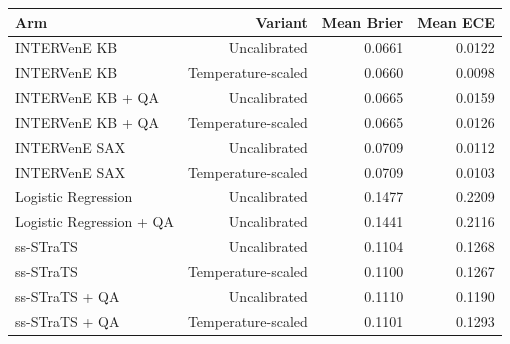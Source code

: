 \begin{tabular}{lrrr}
\toprule
Arm & Variant & Mean Brier & Mean ECE \\
\midrule
INTERVenE KB & Uncalibrated & 0.0661 & 0.0122 \\
INTERVenE KB & Temperature-scaled & 0.0660 & 0.0098 \\
INTERVenE KB + QA & Uncalibrated & 0.0665 & 0.0159 \\
INTERVenE KB + QA & Temperature-scaled & 0.0665 & 0.0126 \\
INTERVenE SAX & Uncalibrated & 0.0709 & 0.0112 \\
INTERVenE SAX & Temperature-scaled & 0.0709 & 0.0103 \\
Logistic Regression & Uncalibrated & 0.1477 & 0.2209 \\
Logistic Regression + QA & Uncalibrated & 0.1441 & 0.2116 \\
ss-STraTS & Uncalibrated & 0.1104 & 0.1268 \\
ss-STraTS & Temperature-scaled & 0.1100 & 0.1267 \\
ss-STraTS + QA & Uncalibrated & 0.1110 & 0.1190 \\
ss-STraTS + QA & Temperature-scaled & 0.1101 & 0.1293 \\
\bottomrule
\end{tabular}

